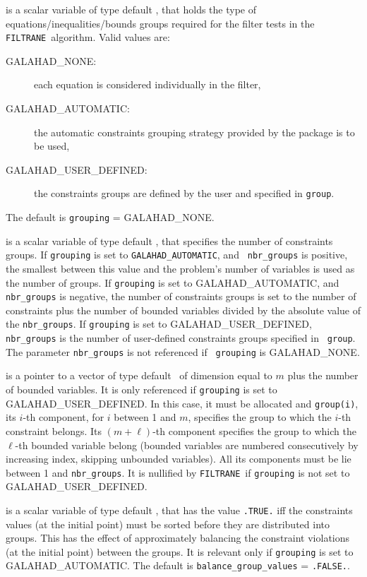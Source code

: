 \documentclass{galahad}
\newcommand{\packagename}{FILTRANE}
\newcommand{\sym}{\sf\small}
\newcommand{\filtrane}{{\tt \packagename}}
\begin{document}
\begin{description}
 is a scalar variable of type default \integer, that holds the
type of equations/inequalities/bounds groups required for the filter tests in
the \filtrane\ algorithm. Valid values are:
\begin{description}
\item[\sym GALAHAD\_NONE:]
each equation is considered individually in the filter,
\item[\sym GALAHAD\_AUTOMATIC:] the automatic constraints grouping strategy
provided by the package is to be used,
\item[\sym GALAHAD\_USER\_DEFINED:] the constraints groups are defined by
the user and specified in {\tt group}.
\end{description}
The default is {\tt grouping} = {\sym GALAHAD\_NONE}.

 is a scalar variable of type default \integer, that
specifies the number of constraints groups.
If {\tt grouping} is set to {\tt GALAHAD\_AUTOMATIC}, and {\tt
nbr\_groups} is positive, the smallest between this value and the
problem's number of variables is used as the number of groups.
If {\tt grouping} is set to {\sym GALAHAD\_AUTOMATIC}, and {\tt
nbr\_groups} is negative, the number of constraints groups is set to
the number of constraints plus the number of bounded variables
divided by the absolute value of the {\tt nbr\_groups}.
If {\tt grouping} is set to {\sym GALAHAD\_USER\_DEFINED}, {\tt
nbr\_groups} is the number of user-defined constraints groups specified in {\tt
group}. The parameter {\tt nbr\_groups} is not referenced if {\tt
grouping} is {\sym GALAHAD\_NONE}.

 is a pointer to a vector of type default \integer\ of dimension
equal to $m$ plus the number of bounded variables. It is only referenced if
{\tt grouping} is set to {\sym GALAHAD\_USER\_DEFINED}. In this case,
it must be allocated and {\tt group(i)}, its $i$-th component, for $i$ between
1 and $m$, specifies the group to which the $i$-th constraint belongs. Its
$(m+\ell)$-th component specifies the group to which the $\ell$-th bounded
variable belong (bounded variables are numbered consecutively by increasing
index, skipping unbounded variables). All its components must be
lie between 1 and {\tt nbr\_groups}.  It is nullified by \filtrane\ if
{\tt grouping} is not set to {\sym GALAHAD\_USER\_DEFINED}.

 is a scalar variable of type default \logical,
that has the value {\tt .TRUE.} iff the constraints values (at the initial
point) must be sorted before they are distributed into groups.
This has the effect of approximately balancing the
constraint violations (at the initial point) between the groups. It is
relevant only if {\tt grouping} is set to {\sym GALAHAD\_AUTOMATIC}.
The default is {\tt balance\_group\_values} = {\tt .FALSE.}.


\end{description}
\end{document}
